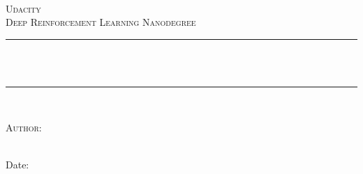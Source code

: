 \begin{titlepage}

\newcommand{\HRule}{\rule{\linewidth}{0.5mm}} %




\begin{center} %

\textsc{\LARGE \reporttype}\\[1.5cm] 
\textsc{\Large Udacity}\\[0.5cm] 
\textsc{\large Deep Reinforcement Learning Nanodegree}\\[0.5cm] 

\HRule \\[0.4cm]
{ \huge \bfseries \reporttitle}\\ %
\HRule \\[1.5cm]
\end{center}

\begin{flushleft} \large
\textsc{Author:}\\
\reportauthor~%
\end{flushleft}
\vspace{2cm}
\makeatletter
Date: \@date 

\vfill %



\makeatother


\end{titlepage}

